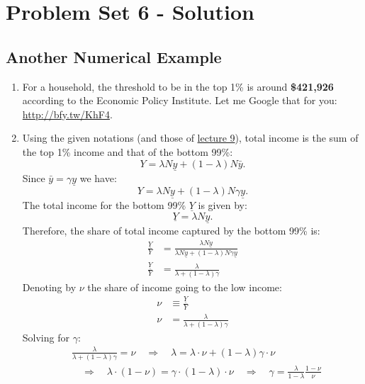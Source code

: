 \documentclass[]{book}
\theoremstyle{definition}
\theoremstyle{definition}
\theoremstyle{definition}
\theoremstyle{remark}
\begin{document}
\hypertarget{pset6-sol}{\chapter{Problem Set 6 -
Solution}\label{pset6-sol}}

\section{Another Numerical Example}\label{another-numerical-example-1}

\begin{enumerate}
\def\labelenumi{\arabic{enumi}.}
\item
  For a household, the threshold to be in the top 1\% is around
  \textbf{\$421,926} according to the Economic Policy Institute. Let me
  Google that for you: \url{http://bfy.tw/KhF4}.
\item
  Using the given notations (and those of
  \protect\hyperlink{redistributive}{lecture 9}), total income is the
  sum of the top 1\% income and that of the bottom 99\%:
  \[Y=\lambda N \underline{y}+(1-\lambda) N \bar{y}.\] Since
  \(\bar{y}=\gamma \underline{y}\) we have:
  \[Y=\lambda N \underline{y}+(1-\lambda) N \gamma \underline{y}.\] The
  total income for the bottom 99\% \(\underline{Y}\) is given by:
  \[\underline{Y}=\lambda N \underline{y}.\] Therefore, the share of
  total income captured by the bottom 99\% is: \[
  \begin{aligned}
  \frac{\underline{Y}}{Y}&=\frac{\lambda N \underline{y}}{\lambda N \underline{y}+(1-\lambda) N \gamma \underline{y}}\\
  \frac{\underline{Y}}{Y}&=\frac{\lambda}{\lambda +(1-\lambda) \gamma}
  \end{aligned}
  \] Denoting by \(\nu\) the share of income going to the low income: \[
  \begin{aligned}
  \nu &\equiv \frac{\underline{Y}}{Y}\\
  \nu &=\frac{\lambda}{\lambda +(1-\lambda) \gamma}
  \end{aligned}
  \] Solving for \(\gamma\): \[
  \begin{aligned}
  & \frac{\lambda}{\lambda +(1-\lambda) \gamma} = \nu \quad \Rightarrow \quad  \lambda  = \lambda \cdot\nu + (1-\lambda)\gamma \cdot \nu \\
  & \quad \Rightarrow \quad \lambda \cdot (1-\nu)=\gamma \cdot (1-\lambda) \cdot \nu \quad \Rightarrow \quad \boxed{\gamma = \frac{\lambda}{1-\lambda}\frac{1-\nu}{\nu}}
  \end{aligned}
\]
\end{enumerate}
\end{document}
